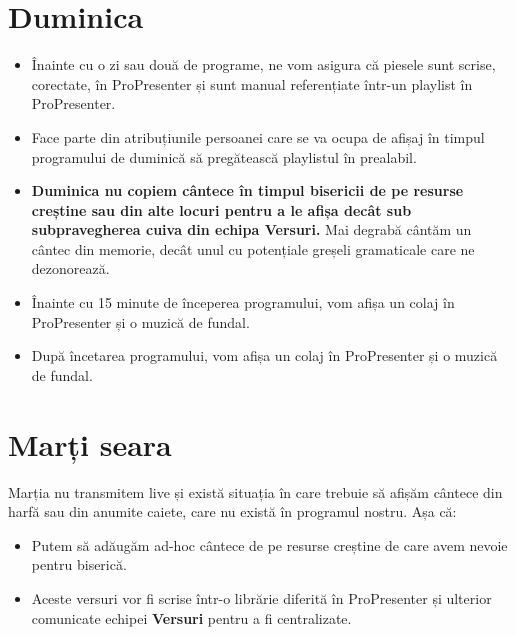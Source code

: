 \documentclass[epjST]{svjour}
\begin{document}
  \section{Duminica}
  \label{sec:3}
  \begin{itemize}
    \item Înainte cu o zi sau două de programe, ne vom asigura că piesele sunt
      scrise, corectate, în ProPresenter și sunt manual referențiate într-un
      playlist în ProPresenter.

    \item Face parte din atribuțiunile persoanei care se va ocupa de afișaj în timpul
      programului de duminică să pregătească playlistul în prealabil.

    \item \textbf{Duminica nu copiem cântece în timpul bisericii de pe resurse
      creștine sau din alte locuri pentru a le afișa decât sub subpravegherea
      cuiva din echipa \textbf{Versuri}.} Mai degrabă cântăm un cântec din
      memorie, decât unul cu potențiale greșeli gramaticale care ne dezonorează.

    \item Înainte cu 15 minute de începerea programului, vom afișa un colaj în
      ProPresenter și o muzică de fundal.

    \item După încetarea programului, vom afișa un colaj în ProPresenter și o
      muzică de fundal.
  \end{itemize}

  \section{Marți seara}
  \label{sec:6} Marția nu transmitem live și există situația în care trebuie să afișăm
  cântece din harfă sau din anumite caiete, care nu există în programul nostru. Așa
  că:
  \begin{itemize}
    \item Putem să adăugăm ad-hoc cântece de pe resurse creștine de care avem nevoie
      pentru biserică.

    \item Aceste versuri vor fi scrise într-o librărie diferită în ProPresenter și
      ulterior comunicate echipei \textbf{Versuri} pentru a fi centralizate.
  \end{itemize}
\end{document}
